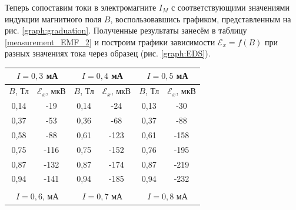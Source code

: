 \documentclass[a4paper, 12pt]{article}
\begin{document}
     Теперь сопоставим токи в электромагните $I_M$ с соответствующими значениями индукции магнитного поля $B$, воспользовавшись графиком, представленным на рис. \ref{graph:graduation}. Полученные результаты занесём в таблицу \ref{measurement_EMF_2} и построим графики зависимости $\mathcal{E}_x = f(B)$ при разных значениях тока через образец (рис. \ref{graph:EDS}).


     \begin{table}[H]
        \centering
        \begin{tabular}{cccccc}
        \hline
        \multicolumn{2}{|c|}{$I = 0,3$ мА} & \multicolumn{2}{c|}{$I = 0,4$ мА} & \multicolumn{2}{c|}{$I = 0,5$ мА} \\ \hline
        \multicolumn{1}{|c|}{$B$, Тл} & \multicolumn{1}{c|}{$\mathcal{E}_x$, мкВ} & \multicolumn{1}{c|}{$B$, Тл} & \multicolumn{1}{c|}{$\mathcal{E}_x$, мкВ} & \multicolumn{1}{c|}{$B$, Тл} & \multicolumn{1}{c|}{$\mathcal{E}_x$, мкВ} \\ \hline
        \multicolumn{1}{|c|}{0,14} & \multicolumn{1}{c|}{-19} & \multicolumn{1}{c|}{0,14} & \multicolumn{1}{c|}{-24} & \multicolumn{1}{c|}{0,13} & \multicolumn{1}{c|}{-30} \\ \hline
        \multicolumn{1}{|c|}{0,37} & \multicolumn{1}{c|}{-53} & \multicolumn{1}{c|}{0,36} & \multicolumn{1}{c|}{-68} & \multicolumn{1}{c|}{0,37} & \multicolumn{1}{c|}{-88} \\ \hline
        \multicolumn{1}{|c|}{0,58} & \multicolumn{1}{c|}{-88} & \multicolumn{1}{c|}{0,61} & \multicolumn{1}{c|}{-123} & \multicolumn{1}{c|}{0,61} & \multicolumn{1}{c|}{-158} \\ \hline
        \multicolumn{1}{|c|}{0,75} & \multicolumn{1}{c|}{-116} & \multicolumn{1}{c|}{0,75} & \multicolumn{1}{c|}{-152} & \multicolumn{1}{c|}{0,76} & \multicolumn{1}{c|}{-195} \\ \hline
        \multicolumn{1}{|c|}{0,87} & \multicolumn{1}{c|}{-132} & \multicolumn{1}{c|}{0,87} & \multicolumn{1}{c|}{-174} & \multicolumn{1}{c|}{0,87} & \multicolumn{1}{c|}{-219} \\ \hline
        \multicolumn{1}{|c|}{0,94} & \multicolumn{1}{c|}{-141} & \multicolumn{1}{c|}{0,94} & \multicolumn{1}{c|}{-185} & \multicolumn{1}{c|}{0,94} & \multicolumn{1}{c|}{-232} \\ \hline
        \multicolumn{1}{l}{} & \multicolumn{1}{l}{} & \multicolumn{1}{l}{} & \multicolumn{1}{l}{} & \multicolumn{1}{l}{} & \multicolumn{1}{l}{} \\ \hline
        \multicolumn{2}{|c|}{$I = 0,6$, мА} & \multicolumn{2}{c|}{$I = 0,7$ мА} & \multicolumn{2}{c|}{$I = 0,8$ мА} \\ \hline

\end{tabular}
\end{table}
\end{document}
